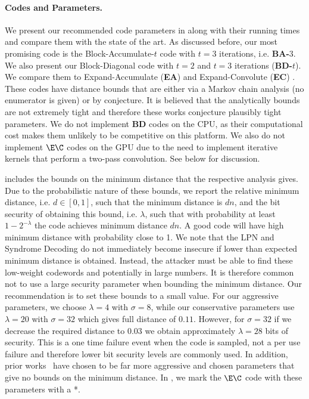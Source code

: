 \paragraph{Codes and Parameters.} We present our recommended code parameters in  along with their running times and compare them with the state of the art. As discussed before, our most promising code is the Block-Accumulate-$t$ code with $t=3$ iterations, i.e. \textbf{BA-$3$}. We also present our Block-Diagonal code with $t=2$ and $t=3$ iterations (\textbf{BD-}$t$). We compare them to Expand-Accumulate (\textbf{EA}) \cite{EA} and Expand-Convolute (\textbf{EC}) \cite{EC}. These codes have distance bounds that are either via a Markov chain analysis (no enumerator is given) or by conjecture. It is believed that the analytically bounds are not extremely tight and therefore these works \cite{EA,EC} conjecture plausibly tight parameters.
 We do not implement \textbf{BD} codes on the CPU, as their computational cost makes them unlikely to be competitive on this platform. We also do not implement $\E\C$ codes on the GPU due to the need to implement iterative kernels that perform a two-pass convolution.  See below for discussion.

 includes the bounds on the minimum distance that the respective analysis gives. Due to the probabilistic nature of these bounds, we report the relative minimum distance, i.e. $d\in [0,1]$, such that the minimum distance is $dn$, and the bit security of obtaining this bound, i.e. $\lambda$, such that with probability at least $1-2^{-\lambda}$ the code achieves minimum distance $dn$. A good code will have high minimum distance with probability close to 1. We note that the LPN and Syndrome Decoding do not immediately become insecure if lower than expected minimum distance is obtained. Instead, the attacker must be able to find these low-weight codewords and potentially in large numbers. It is therefore common not to use a large security parameter when bounding the minimum distance. Our recommendation is to set these bounds to a small value. For our aggressive parameters, we choose $\lambda=4$ with $\sigma=8$, while our conservative parameters use $\lambda=20$ with  $\sigma=32$ which gives full distance of $0.11$. However, for $\sigma=32$ if we decrease the required distance to $0.03$ we obtain approximately $\lambda=28$ bits of security. This is a one time failure event when the code is sampled, not a per use failure and therefore lower bit security levels are commonly used. 
In addition, prior works~\cite{EA,EC} have chosen to be far more aggressive and chosen parameters that give no bounds on the minimum distance. In , we mark the $\E\C$ code with these parameters with a *. %


